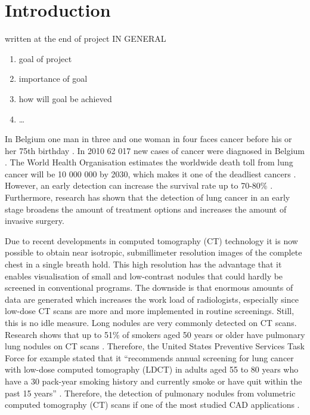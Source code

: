 \section{Introduction}

written at the end of project
IN GENERAL
\begin{enumerate}
\item goal of project
\item importance of goal
\item how will goal be achieved
\item \ldots
\end{enumerate}

In Belgium one man in three and one woman in four faces cancer before his or
her 75th birthday \cite{kanker}. In 2010 62 017 new cases of cancer were
diagnosed in Belgium \cite{kankerliga}. The World Health Organisation estimates
the worldwide death toll from lung cancer will be 10 000 000 by 2030, which
makes it one of the deadliest cancers \cite{gu, zheng}.
However, an early detection can increase the survival rate up to 70-80\%
\cite{swensen}. Furthermore, research has shown that the detection of lung
cancer in an early stage broadens the amount of treatment options and increases
the amount of invasive surgery\cite{greenlee}.


Due to recent developments in
computed tomography (CT) technology it is now possible to obtain near isotropic,
submillimeter resolution images of the complete chest in a single breath hold.
This high resolution has the advantage that it enables visualisation of small
and low-contrast nodules that could hardly be screened in conventional
programs. The downside is that enormous amounts of data are generated
which increases the work load of radiologists, especially since low-dose CT
scans are more and more implemented in routine screenings. Still, this is no
idle measure. Long nodules are very commonly detected on CT scans. Research
shows that up to 51\% of smokers aged 50 years or older have pulmonary lung
nodules on CT scans \cite{mahon}. Therefore, the United States Preventive
Services Task Force for example stated that it ``recommends annual screening for
lung cancer with low-dose computed tomography (LDCT) in adults aged 55 to 80
years who have a 30 pack-year smoking history and currently smoke or have quit
within the past 15 years'' \cite{ups}.
Therefore, the detection of pulmonary nodules from volumetric computed
tomography (CT) scans if one of the most studied CAD applications
\cite{sluimer}.


